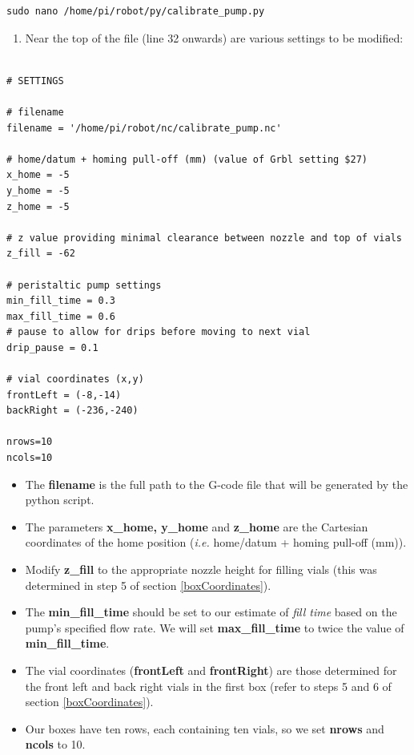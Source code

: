 \documentclass[
]{book}
\providecommand{\tightlist}{%
  \setlength{\itemsep}{0pt}\setlength{\parskip}{0pt}}
\begin{document}
\begin{verbatim}
sudo nano /home/pi/robot/py/calibrate_pump.py
\end{verbatim}

\begin{enumerate}
\def\labelenumi{\arabic{enumi}.}
\setcounter{enumi}{1}
\tightlist
\item
  Near the top of the file (line 32 onwards) are various settings to be modified:
\end{enumerate}

\begin{verbatim}

# SETTINGS

# filename
filename = '/home/pi/robot/nc/calibrate_pump.nc'

# home/datum + homing pull-off (mm) (value of Grbl setting $27)
x_home = -5
y_home = -5
z_home = -5

# z value providing minimal clearance between nozzle and top of vials
z_fill = -62 

# peristaltic pump settings
min_fill_time = 0.3
max_fill_time = 0.6
# pause to allow for drips before moving to next vial
drip_pause = 0.1 

# vial coordinates (x,y)
frontLeft = (-8,-14)
backRight = (-236,-240)

nrows=10
ncols=10
\end{verbatim}

\begin{itemize}
\tightlist
\item
  The \textbf{filename} is the full path to the G-code file that will be generated by the python script.
\item
  The parameters \textbf{x\_home, y\_home} and \textbf{z\_home} are the Cartesian coordinates of the home position (\emph{i.e.} home/datum + homing pull-off (mm)).
\item
  Modify \textbf{z\_fill} to the appropriate nozzle height for filling vials (this was determined in step 5 of section \ref{boxCoordinates}).
\item
  The \textbf{min\_fill\_time} should be set to our estimate of \emph{fill time} based on the pump's specified flow rate. We will set \textbf{max\_fill\_time} to twice the value of \textbf{min\_fill\_time}.
\item
  The vial coordinates (\textbf{frontLeft} and \textbf{frontRight}) are those determined for the front left and back right vials in the first box (refer to steps 5 and 6 of section \ref{boxCoordinates}).
\item
  Our boxes have ten rows, each containing ten vials, so we set \textbf{nrows} and \textbf{ncols} to 10.
\end{itemize}
\end{document}

